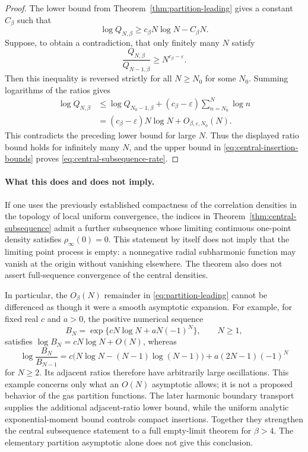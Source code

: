 \documentclass[11pt,a4paper]{article}
\numberwithin{equation}{section}
\theoremstyle{definition}
\theoremstyle{remark}
\begin{document}
\begin{proof}
The lower bound from Theorem~\ref{thm:partition-leading} gives a constant
$C_\beta$ such that
\[
 \log Q_{N,\beta}\geq c_\beta N\log N-C_\beta N.
\]
Suppose, to obtain a contradiction, that only finitely many $N$ satisfy
\[
 \frac{Q_{N,\beta}}{Q_{N-1,\beta}}
 \geq N^{c_\beta-\varepsilon}.
\]
Then this inequality is reversed strictly for all $N\geq N_0$ for some
$N_0$.  Summing logarithms of the ratios gives
\begin{align*}
 \log Q_{N,\beta}
 &\leq\log Q_{N_0-1,\beta}
   +(c_\beta-\varepsilon)\sum_{n=N_0}^N\log n\\
 &=(c_\beta-\varepsilon)N\log N+O_{\beta,\varepsilon,N_0}(N).
\end{align*}
This contradicts the preceding lower bound for large $N$.  Thus the
displayed ratio bound holds for infinitely many $N$, and the upper bound
in \eqref{eq:central-insertion-bounds} proves
\eqref{eq:central-subsequence-rate}.
\end{proof}

\paragraph{What this does and does not imply.}
If one uses the previously established compactness of the correlation
densities in the topology of local uniform convergence, the indices in
Theorem~\ref{thm:central-subsequence} admit a further subsequence whose
limiting continuous one-point density satisfies $\rho_\infty(0)=0$.
This statement by itself does not imply that the limiting point process
is empty: a nonnegative radial subharmonic function may vanish at the
origin without vanishing elsewhere.  The theorem also does not assert
full-sequence convergence of the central densities.

In particular, the $O_\beta(N)$ remainder in
\eqref{eq:partition-leading} cannot be differenced as though it were a
smooth asymptotic expansion.  For example, for fixed real $c$ and $a>0$,
the positive numerical sequence
\[
 B_N=\exp\{cN\log N+aN(-1)^N\},\qquad N\geq1,
\]
satisfies $\log B_N=cN\log N+O(N)$, whereas
\[
 \log\frac{B_N}{B_{N-1}}
 =c\bigl(N\log N-(N-1)\log(N-1)\bigr)
   +a(2N-1)(-1)^N
\]
for $N\geq2$.  Its adjacent ratios therefore have arbitrarily large
oscillations.  This example concerns only what an $O(N)$ asymptotic
allows; it is not a proposed behavior of the gas partition functions.
The later harmonic boundary transport supplies the additional
adjacent-ratio lower bound, while the uniform analytic exponential-moment
bound controls compact insertions. Together they strengthen the central
subsequence statement to a full empty-limit theorem for $\beta>4$.
The elementary partition asymptotic alone does not give this conclusion.
\end{document}
